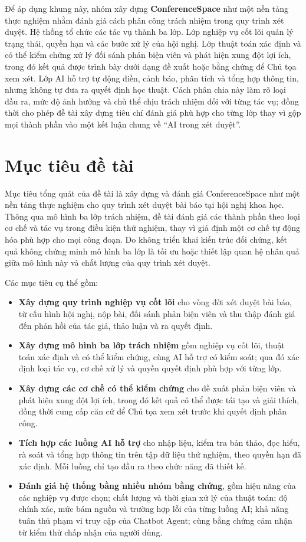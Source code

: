 Để áp dụng khung này, nhóm xây dựng \textbf{ConferenceSpace} như một nền tảng thực nghiệm nhằm đánh giá cách phân công trách nhiệm trong quy trình xét duyệt. Hệ thống tổ chức các tác vụ thành ba lớp. Lớp nghiệp vụ cốt lõi quản lý trạng thái, quyền hạn và các bước xử lý của hội nghị. Lớp thuật toán xác định và có thể kiểm chứng xử lý đối sánh phản biện viên và phát hiện xung đột lợi ích, trong đó kết quả được trình bày dưới dạng đề xuất hoặc bằng chứng để Chủ tọa xem xét. Lớp AI hỗ trợ tự động điền, cảnh báo, phân tích và tổng hợp thông tin, nhưng không tự đưa ra quyết định học thuật. Cách phân chia này làm rõ loại đầu ra, mức độ ảnh hưởng và chủ thể chịu trách nhiệm đối với từng tác vụ; đồng thời cho phép đề tài xây dựng tiêu chí đánh giá phù hợp cho từng lớp thay vì gộp mọi thành phần vào một kết luận chung về ``AI trong xét duyệt''.

\section{Mục tiêu đề tài}

Mục tiêu tổng quát của đề tài là xây dựng và đánh giá ConferenceSpace như một nền tảng thực nghiệm cho quy trình xét duyệt bài báo tại hội nghị khoa học. Thông qua mô hình ba lớp trách nhiệm, đề tài đánh giá các thành phần theo loại cơ chế và tác vụ trong điều kiện thử nghiệm, thay vì giả định một cơ chế tự động hóa phù hợp cho mọi công đoạn. Do không triển khai kiến trúc đối chứng, kết quả không chứng minh mô hình ba lớp là tối ưu hoặc thiết lập quan hệ nhân quả giữa mô hình này và chất lượng của quy trình xét duyệt.

Các mục tiêu cụ thể gồm:

\begin{itemize}
\item \textbf{Xây dựng quy trình nghiệp vụ cốt lõi} cho vòng đời xét duyệt bài báo, từ cấu hình hội nghị, nộp bài, đối sánh phản biện viên và thu thập đánh giá đến phản hồi của tác giả, thảo luận và ra quyết định.
\item \textbf{Xây dựng mô hình ba lớp trách nhiệm} gồm nghiệp vụ cốt lõi, thuật toán xác định và có thể kiểm chứng, cùng AI hỗ trợ có kiểm soát; qua đó xác định loại tác vụ, cơ chế xử lý và quyền quyết định phù hợp với từng lớp.
\item \textbf{Xây dựng các cơ chế có thể kiểm chứng} cho đề xuất phản biện viên và phát hiện xung đột lợi ích, trong đó kết quả có thể được tái tạo và giải thích, đồng thời cung cấp căn cứ để Chủ tọa xem xét trước khi quyết định phân công.
\item \textbf{Tích hợp các luồng AI hỗ trợ} cho nhập liệu, kiểm tra bản thảo, đọc hiểu, rà soát và tổng hợp thông tin trên tập dữ liệu thử nghiệm, theo quyền hạn đã xác định. Mỗi luồng chỉ tạo đầu ra theo chức năng đã thiết kế.
\item \textbf{Đánh giá hệ thống bằng nhiều nhóm bằng chứng}, gồm hiệu năng của các nghiệp vụ được chọn; chất lượng và thời gian xử lý của thuật toán; độ chính xác, mức bám nguồn và trường hợp lỗi của từng luồng AI; khả năng tuân thủ phạm vi truy cập của Chatbot Agent; cùng bằng chứng cảm nhận từ kiểm thử chấp nhận của người dùng.
\end{itemize}

